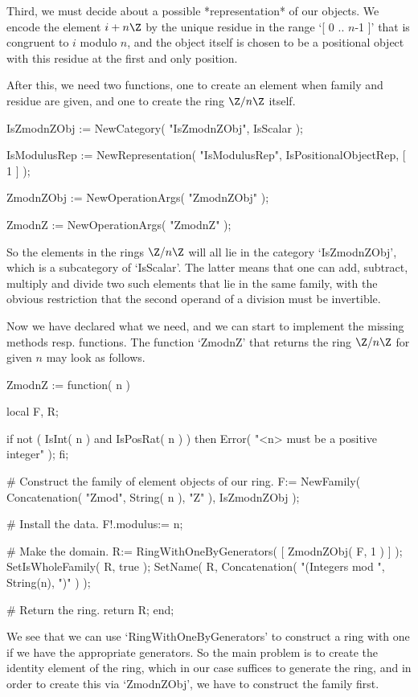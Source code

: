 Third, we must decide about a possible *representation* of our objects.
We encode the element $i + n\Z$ by the unique residue in the range
`[ 0 .. $n$-1 ]' that is congruent to $i$ modulo $n$,
and the object itself is chosen to be a positional object with this
residue at the first and only position.

After this, we need two functions,
one to create an element when family and residue are given,
and one to create the ring $\Z/n\Z$ itself.

\beginexample
    IsZmodnZObj := NewCategory( "IsZmodnZObj", IsScalar );

    IsModulusRep := NewRepresentation( "IsModulusRep",
        IsPositionalObjectRep,
        [ 1 ] );

    ZmodnZObj := NewOperationArgs( "ZmodnZObj" );

    ZmodnZ := NewOperationArgs( "ZmodnZ" );
\endexample

So the elements in the rings $\Z/n\Z$ will all lie in the category
`IsZmodnZObj',
which is a subcategory of `IsScalar'.
The latter means that one can add, subtract, multiply and divide
two such elements that lie in the same family,
with the obvious restriction that the second operand of a division
must be invertible.

Now we have declared what we need,
and we can start to implement the missing methods resp. functions.
The function `ZmodnZ' that returns the ring $\Z/n\Z$ for given $n$
may look as follows.

\beginexample
    ZmodnZ := function( n )

        local F, R;

        if not ( IsInt( n ) and IsPosRat( n ) ) then
          Error( "<n> must be a positive integer" );
        fi;

        # Construct the family of element objects of our ring.
        F:= NewFamily( Concatenation( "Zmod", String( n ), "Z" ),
                       IsZmodnZObj );

        # Install the data.
        F!.modulus:= n;

        # Make the domain.
        R:= RingWithOneByGenerators( [ ZmodnZObj( F, 1 ) ] );
        SetIsWholeFamily( R, true );
        SetName( R, Concatenation( "(Integers mod ", String(n), ")" ) );

        # Return the ring.
        return R;
    end;
\endexample

We see that we can use `RingWithOneByGenerators' to construct a ring
with one if we have the appropriate generators.
So the main problem is to create the identity element of the ring,
which in our case suffices to generate the ring,
and in order to create this via `ZmodnZObj',
we have to construct the family first.

